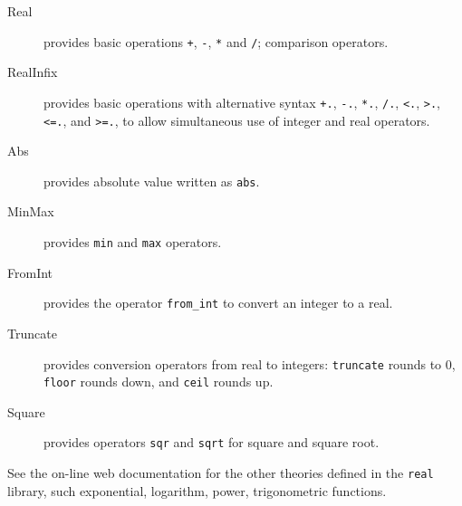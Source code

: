 \begin{description}

\item[Real] provides basic operations \verb|+|, \verb|-|, \verb|*| and \verb|/|;
  comparison operators.

\item[RealInfix] provides basic operations with alternative syntax \verb|+.|,
  \verb|-.|, \verb|*.|, \verb|/.|, \verb|<.|, \verb|>.|, \verb|<=.|, and \verb|>=.|, to
  allow simultaneous use of integer and real operators.

\item[Abs] provides absolute value written as \verb|abs|.

\item[MinMax] provides \verb|min| and \verb|max| operators.

\item[FromInt] provides the operator \verb|from_int| to convert an integer to a real.

\item[Truncate] provides conversion operators from real to integers:
  \verb|truncate| rounds to 0, \verb|floor| rounds down, and
  \verb|ceil| rounds up.

\item[Square] provides operators \verb|sqr| and \verb|sqrt| for square and square root.







\end{description}

See the on-line web documentation for the other theories defined in the
\texttt{real} library, such exponential, logarithm, power,
trigonometric functions.

